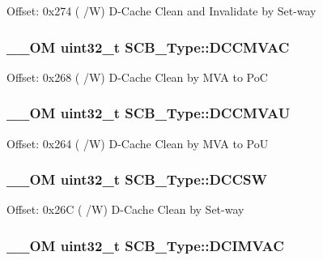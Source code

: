 Offset\-: 0x274 ( /\-W) D-\/\-Cache Clean and Invalidate by Set-\/way \hypertarget{struct_s_c_b___type_a042e3622c98de4e908cfda4f70d1f097}{
\subsubsection[{D\-C\-C\-M\-V\-A\-C}]{\setlength{\rightskip}{0pt plus 5cm}\-\_\-\-\_\-\-O\-M uint32\-\_\-t S\-C\-B\-\_\-\-Type\-::\-D\-C\-C\-M\-V\-A\-C}}\label{struct_s_c_b___type_a042e3622c98de4e908cfda4f70d1f097}
Offset\-: 0x268 ( /\-W) D-\/\-Cache Clean by M\-V\-A to Po\-C \hypertarget{struct_s_c_b___type_aae3caeea159ab54859ea11397f942cfa}{
\subsubsection[{D\-C\-C\-M\-V\-A\-U}]{\setlength{\rightskip}{0pt plus 5cm}\-\_\-\-\_\-\-O\-M uint32\-\_\-t S\-C\-B\-\_\-\-Type\-::\-D\-C\-C\-M\-V\-A\-U}}\label{struct_s_c_b___type_aae3caeea159ab54859ea11397f942cfa}
Offset\-: 0x264 ( /\-W) D-\/\-Cache Clean by M\-V\-A to Po\-U \hypertarget{struct_s_c_b___type_ab95cc818be9fa7d25ae516f3fe6b7788}{
\subsubsection[{D\-C\-C\-S\-W}]{\setlength{\rightskip}{0pt plus 5cm}\-\_\-\-\_\-\-O\-M uint32\-\_\-t S\-C\-B\-\_\-\-Type\-::\-D\-C\-C\-S\-W}}\label{struct_s_c_b___type_ab95cc818be9fa7d25ae516f3fe6b7788}
Offset\-: 0x26\-C ( /\-W) D-\/\-Cache Clean by Set-\/way \hypertarget{struct_s_c_b___type_a4be79491ab1ed14f3b0237ba7e69063c}{
\subsubsection[{D\-C\-I\-M\-V\-A\-C}]{\setlength{\rightskip}{0pt plus 5cm}\-\_\-\-\_\-\-O\-M uint32\-\_\-t S\-C\-B\-\_\-\-Type\-::\-D\-C\-I\-M\-V\-A\-C}}\label{struct_s_c_b___type_a4be79491ab1ed14f3b0237ba7e69063c}

